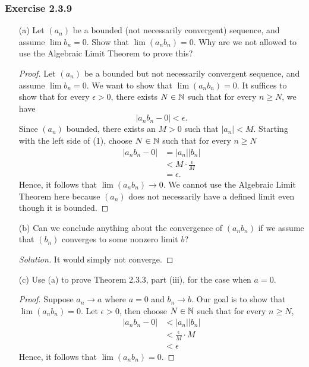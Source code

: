 \subsubsection{Exercise 2.3.9}
\begin{enumerate}
    \item[(a)] Let \( (a_n)\) be a bounded (not necessarily convergent) sequence, and assume \( \lim b_n  = 0\). Show that \( \lim (a_n b_n) = 0\). Why are we not allowed to use the Algebraic Limit Theorem to prove this? 
        \begin{proof}
        Let \( (a_n)\) be a bounded but not necessarily convergent sequence, and assume \( \lim b_n = 0 \). We want to show that \( \lim (a_n b_n ) = 0\). It suffices to show that for every \( \epsilon  > 0\), there exists \( N \in \mathbb{N}\) such that for every \( n \geq N \), we have 
        \[ | a_nb_n - 0 | < \epsilon. \tag{1}\]
        Since \( (a_n)\) bounded, there exists an \( M > 0\) such that \( | a_n  | < M \). Starting with the left side of (1), choose \( N \in \mathbb{N} \) such that for every \( n \geq N \) 
        \begin{align*}
            | a_n b_n - 0 |&= | a_n | | b_n |\\
                           &< M \cdot \frac{ \epsilon }{M} \tag{\(b_n \to 0\)} \\ 
                           &= \epsilon. 
        \end{align*}
        Hence, it follows that \( \lim (a_n b_n) \to 0\). We cannot use the Algebraic Limit Theorem here because \( (a_n)\) does not necessarily have a defined limit even though it is bounded.
        \end{proof}
    \item[(b)] Can we conclude anything about the convergence of \( (a_nb_n)\) if we assume that \( (b_n)\) converges to some nonzero limit \( b \)?
        \begin{proof}[Solution]
        It would simply not converge.
        \end{proof}
    \item[(c)] Use (a) to prove Theorem 2.3.3, part (iii), for the case when \( a = 0\). 
        \begin{proof}
            Suppose \( a_n \to a\) where \( a = 0\) and \( b_n \to b\). Our goal is to show that \( \lim(a_n b_n) = 0\). Let \( \epsilon > 0 \), then choose \( N \in \mathbb{N} \) such that for every \( n \geq N \),  
        \begin{align*}
         | a_nb_n - 0| &< | a_n | | b_n |   \\
                       &< \frac{ \epsilon }{ M } \cdot M  \tag{\( a_n \to 0, b_n \to b\)} \\ 
                       &< \epsilon   
        \end{align*}
        Hence, it follows that \( \lim (a_nb_n) = 0\).
        \end{proof}
\end{enumerate}


